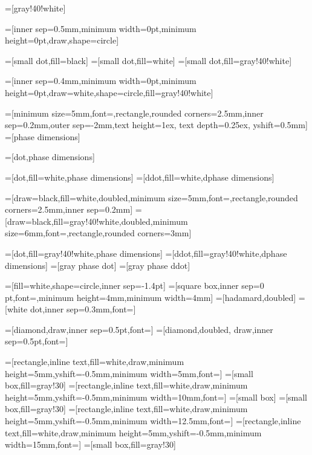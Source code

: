 =[gray!40!white]


=[inner sep=0.5mm,minimum width=0pt,minimum height=0pt,draw,shape=circle]

=[small dot,fill=black]
=[small dot,fill=white]
=[small dot,fill=gray!40!white]

=[inner sep=0.4mm,minimum width=0pt,minimum height=0pt,draw=white,shape=circle,fill=gray!40!white]


=[minimum size=5mm,font=\footnotesize,rectangle,rounded corners=2.5mm,inner sep=0.2mm,outer sep=-2mm,text height=1ex, text depth=0.25ex, yshift=0.5mm]
=[phase dimensions]

=[dot,phase dimensions]

=[dot,fill=white,phase dimensions]
=[ddot,fill=white,dphase dimensions]

=[draw=black,fill=white,doubled,minimum size=5mm,font=\footnotesize,rectangle,rounded corners=2.5mm,inner sep=0.2mm]
=[draw=black,fill=gray!40!white,doubled,minimum size=6mm,font=\footnotesize,rectangle,rounded corners=3mm]

=[dot,fill=gray!40!white,phase dimensions]
=[ddot,fill=gray!40!white,dphase dimensions]
=[gray phase dot]
=[gray phase ddot]


=[fill=white,shape=circle,inner sep=-1.4pt]
=[square box,inner sep=0 pt,font=\footnotesize,minimum height=4mm,minimum width=4mm]
=[hadamard,doubled]
=[white dot,inner sep=0.3mm,font=\footnotesize]

=[diamond,draw,inner sep=0.5pt,font=\small]
=[diamond,doubled, draw,inner sep=0.5pt,font=\small]

=[rectangle,inline text,fill=white,draw,minimum height=5mm,yshift=-0.5mm,minimum width=5mm,font=\small]
=[small box,fill=gray!30]
=[rectangle,inline text,fill=white,draw,minimum height=5mm,yshift=-0.5mm,minimum width=10mm,font=\small]
=[small box] %
=[small box,fill=gray!30]
=[rectangle,inline text,fill=white,draw,minimum height=5mm,yshift=-0.5mm,minimum width=12.5mm,font=\small]
=[rectangle,inline text,fill=white,draw,minimum height=5mm,yshift=-0.5mm,minimum width=15mm,font=\small]
=[small box,fill=gray!30]

